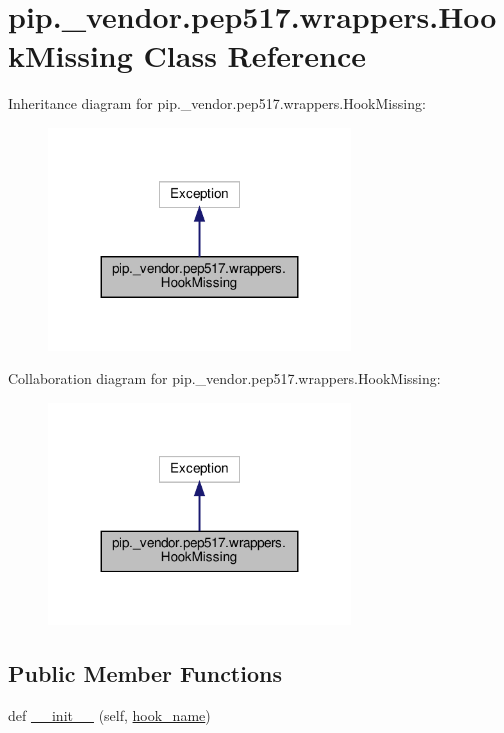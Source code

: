 \hypertarget{classpip_1_1__vendor_1_1pep517_1_1wrappers_1_1HookMissing}{}\section{pip.\+\_\+vendor.\+pep517.\+wrappers.\+Hook\+Missing Class Reference}
\label{classpip_1_1__vendor_1_1pep517_1_1wrappers_1_1HookMissing}


Inheritance diagram for pip.\+\_\+vendor.\+pep517.\+wrappers.\+Hook\+Missing\+:
\nopagebreak
\begin{figure}[H]
\begin{center}
\leavevmode
\includegraphics[width=227pt]{classpip_1_1__vendor_1_1pep517_1_1wrappers_1_1HookMissing__inherit__graph}
\end{center}
\end{figure}


Collaboration diagram for pip.\+\_\+vendor.\+pep517.\+wrappers.\+Hook\+Missing\+:
\nopagebreak
\begin{figure}[H]
\begin{center}
\leavevmode
\includegraphics[width=227pt]{classpip_1_1__vendor_1_1pep517_1_1wrappers_1_1HookMissing__coll__graph}
\end{center}
\end{figure}
\subsection*{Public Member Functions}
\begin{DoxyCompactItemize}
\item 
def \hyperlink{classpip_1_1__vendor_1_1pep517_1_1wrappers_1_1HookMissing_ac0374eecacf882dbd074d5c8df0a43f0}{\+\_\+\+\_\+init\+\_\+\+\_\+} (self, \hyperlink{classpip_1_1__vendor_1_1pep517_1_1wrappers_1_1HookMissing_ac8e3afdce88806fcbc06064e4c6d5918}{hook\+\_\+name})
\end{DoxyCompactItemize}
